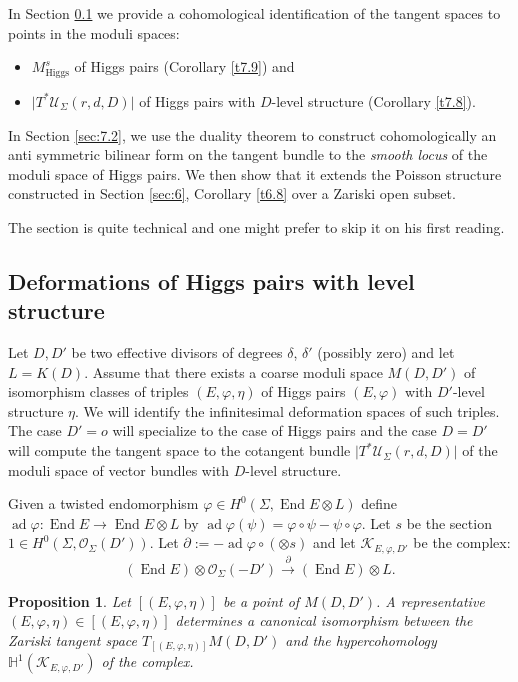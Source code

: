 \documentclass[12pt,a4paper,oneside,english]{smfart}
\newtheorem{prop}[thm]{Proposition}
\theoremstyle{definition}
\theoremstyle{remark}
\DeclareMathOperator{\End}{End}
\DeclareMathOperator{\ad}{ad}
\newcommand{\Hig}{\mathrm{Higgs}}
\newcommand{\MHs}{M^{s}_{\Hig}}
\newcommand{\cU}{\mathcal{U}}
\newcommand{\cO}{\mathcal{O}}
\newcommand{\KK}{\mathscr{K}}
\newcommand{\HH}{\mathbb{H}}
\newcommand{\tot}[1]{\lvert #1 \rvert}
\begin{document}
In Section \ref{sec:7.1} we provide a cohomological identification of the tangent spaces to points in the moduli spaces:
\begin{itemize}
    \item $\MHs$ of Higgs pairs (Corollary \ref{t7.9}) and
    \item $\tot{T^*\cU_\Sigma(r, d, D)}$ of Higgs pairs with $D$-level structure (Corollary \ref{t7.8}).
\end{itemize}
In Section \ref{sec:7.2}, we use the duality theorem to construct cohomologically an anti symmetric bilinear form on the tangent bundle to the \emph{smooth locus} of the moduli space of Higgs pairs. We then show that it extends the Poisson structure constructed in Section \ref{sec:6}, Corollary \ref{t6.8} over a Zariski open subset.

The section is quite technical and one might prefer to skip it on his first reading.

\subsection{Deformations of Higgs pairs with level structure}\label{sec:7.1}

Let $D, D'$ be two effective divisors of degrees $\delta$, $\delta'$ (possibly zero) and let $L = K(D)$. Assume that there exists a coarse moduli space $M(D, D')$ of isomorphism classes of triples $(E, \varphi, \eta)$ of Higgs pairs $(E, \varphi)$ with $D'$-level structure $\eta$. We will identify the infinitesimal deformation spaces of such triples. The case $D' = o$ will specialize to the case of Higgs pairs and the case $D = D'$ will compute the tangent space to the cotangent bundle $\tot{T^*\cU_\Sigma(r, d, D)}$ of the moduli space of vector bundles with $D$-level structure.

Given a twisted endomorphism $\varphi \in H^0(\Sigma, \End E \otimes L)$ define $\ad \varphi \colon \End E \to \End E \otimes L$ by $\ad \varphi(\psi) = \varphi \circ \psi - \psi \circ \varphi$. Let $s$ be the section $1 \in H^0(\Sigma, \cO_\Sigma(D'))$. Let $\partial := -\ad \varphi \circ (\otimes s)$ and let $\KK_{E, \varphi, D'}$ be the complex:
\[
(\End E) \otimes \cO_\Sigma(-D') \xrightarrow{\ \partial\ } (\End E) \otimes L.
\]

\begin{prop}\label{t7.1}
Let $[(E, \varphi, \eta)]$ be a point of $M(D, D')$. A representative $(E, \varphi, \eta) \in [(E, \varphi, \eta)]$ determines a canonical isomorphism between the Zariski tangent space $T_{[(E, \varphi, \eta)]}M(D, D')$ and the hypercohomology $\HH^1(\KK_{E, \varphi, D'})$ of the complex.
\end{prop}
\end{document}
